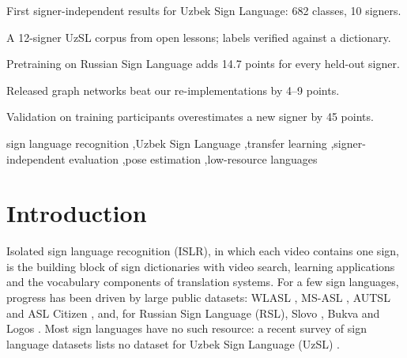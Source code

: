 \documentclass[a4paper,fleqn]{cas-dc}
\begin{document}
\begin{highlights}
\item First signer-independent results for Uzbek Sign Language: 682 classes, 10 signers.
\item A 12-signer UzSL corpus from open lessons; labels verified against a dictionary.
\item Pretraining on Russian Sign Language adds 14.7 points for every held-out signer.
\item Released graph networks beat our re-implementations by 4–9 points.
\item Validation on training participants overestimates a new signer by 45 points.
\end{highlights}
\begin{keywords}
sign language recognition \sep Uzbek Sign Language \sep transfer learning \sep signer-independent evaluation \sep pose estimation \sep low-resource languages
\end{keywords}
\maketitle
\hypertarget{introduction}{%
\section{Introduction}\label{introduction}}

Isolated sign language recognition (ISLR), in which each video contains one sign, is the building block of sign dictionaries with video search, learning applications and the vocabulary components of translation systems. For a few sign languages, progress has been driven by large public datasets: WLASL \cite{2020_li_wlasl}, MS-ASL \cite{2019_joze_msasl}, AUTSL \cite{2020_sincan_autsl} and ASL Citizen \cite{2023_desai_asl_citizen}, and, for Russian Sign Language (RSL), Slovo \cite{2023_kapitanov_slovo}, Bukva \cite{2024_kvanchiani_bukva} and Logos \cite{2025_ovodov_logos}. Most sign languages have no such resource: a recent survey of sign language datasets lists no dataset for Uzbek Sign Language (UzSL) \cite{2026_ni_sign_language_datasets_survey}.
\end{document}
